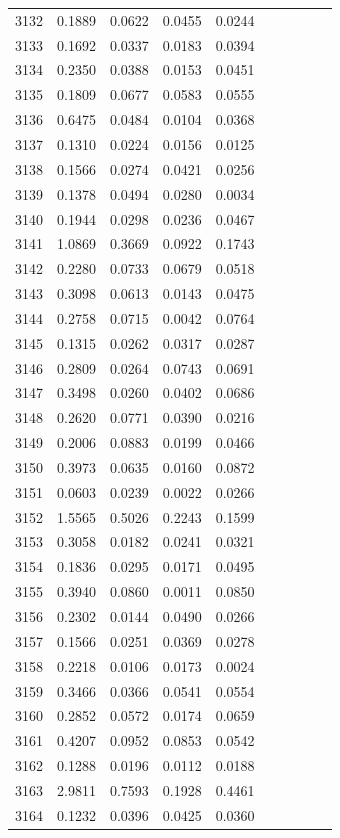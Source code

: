 \begin{table}
\begin{tabular}{cccccccccc}
3132& 0.1889& 0.0622& 0.0455& 0.0244\\ 
3133& 0.1692& 0.0337& 0.0183& 0.0394\\ 
3134& 0.2350& 0.0388& 0.0153& 0.0451\\ 
3135& 0.1809& 0.0677& 0.0583& 0.0555\\ 
3136& 0.6475& 0.0484& 0.0104& 0.0368\\ 
3137& 0.1310& 0.0224& 0.0156& 0.0125\\ 
3138& 0.1566& 0.0274& 0.0421& 0.0256\\ 
3139& 0.1378& 0.0494& 0.0280& 0.0034\\ 
3140& 0.1944& 0.0298& 0.0236& 0.0467\\ 
3141& 1.0869& 0.3669& 0.0922& 0.1743\\ 
3142& 0.2280& 0.0733& 0.0679& 0.0518\\ 
3143& 0.3098& 0.0613& 0.0143& 0.0475\\ 
3144& 0.2758& 0.0715& 0.0042& 0.0764\\ 
3145& 0.1315& 0.0262& 0.0317& 0.0287\\ 
3146& 0.2809& 0.0264& 0.0743& 0.0691\\ 
3147& 0.3498& 0.0260& 0.0402& 0.0686\\ 
3148& 0.2620& 0.0771& 0.0390& 0.0216\\ 
3149& 0.2006& 0.0883& 0.0199& 0.0466\\ 
3150& 0.3973& 0.0635& 0.0160& 0.0872\\ 
3151& 0.0603& 0.0239& 0.0022& 0.0266\\ 
3152& 1.5565& 0.5026& 0.2243& 0.1599\\ 
3153& 0.3058& 0.0182& 0.0241& 0.0321\\ 
3154& 0.1836& 0.0295& 0.0171& 0.0495\\ 
3155& 0.3940& 0.0860& 0.0011& 0.0850\\ 
3156& 0.2302& 0.0144& 0.0490& 0.0266\\ 
3157& 0.1566& 0.0251& 0.0369& 0.0278\\ 
3158& 0.2218& 0.0106& 0.0173& 0.0024\\ 
3159& 0.3466& 0.0366& 0.0541& 0.0554\\ 
3160& 0.2852& 0.0572& 0.0174& 0.0659\\ 
3161& 0.4207& 0.0952& 0.0853& 0.0542\\ 
3162& 0.1288& 0.0196& 0.0112& 0.0188\\ 
3163& 2.9811& 0.7593& 0.1928& 0.4461\\ 
3164& 0.1232& 0.0396& 0.0425& 0.0360\\ 

\end{tabular}
\end{table}

